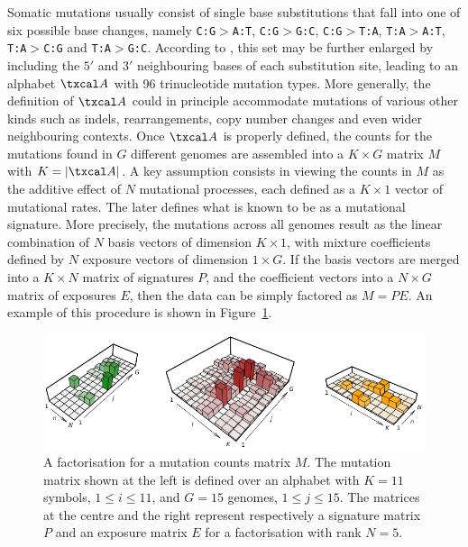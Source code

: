 \documentclass{bioinfo}
\begin{document}
Somatic mutations usually consist of single base substitutions that
fall into one of six possible base changes, namely
\texttt{C:G}$>$\texttt{A:T}, \texttt{C:G}$>$\texttt{G:C},
\texttt{C:G}$>$\texttt{T:A}, \texttt{T:A}$>$\texttt{A:T},
\texttt{T:A}$>$\texttt{C:G} and \texttt{T:A}$>$\texttt{G:C}. According
to \cite{A}, this set may be further enlarged by including the $5'$
and $3'$ neighbouring bases of each substitution site, leading to an 
alphabet $\txcal A$ with 96 trinucleotide mutation types. More
generally, the definition of $\txcal A$ could in principle accommodate
mutations of various other kinds such as indels, rearrangements, copy
number changes and even wider neighbouring contexts. Once $\txcal A$
is properly defined, the counts for the mutations found in $G$
different genomes are assembled into a $K\times G$ matrix $M$ with $K
= |\txcal A|$. A key assumption consists in viewing the counts in $M$
as the additive effect of $N$ mutational processes, each defined as a
$K\times 1$ vector of mutational rates. The later defines what
is known to be as a mutational signature. More precisely, the
mutations across all genomes result as the linear combination of $N$
basis vectors of dimension $K\times 1$, with mixture coefficients
defined by $N$ exposure vectors of dimension $1 \times G$. If the
basis vectors are merged into a $K\times N$ matrix of signatures $P$,
and the coefficient vectors into a $N\times G$ matrix of exposures
$E$, then the data can be simply factored as $M=PE$. An example of
this procedure is shown in Figure~\ref{fig:toyNMF}.

\begin{figure}
 \centering\includegraphics[width=15cm]{figs/f}
 \caption{\textrm{%
  A factorisation for a mutation counts matrix $M$. The
mutation matrix shown at the left is defined over an alphabet with
$K=11$ symbols, $1 \leqslant i \leqslant 11$, and $G=15$ genomes,
$1\leqslant j\leqslant 15$. The matrices at the centre and the right
represent respectively a signature matrix $P$ and an exposure matrix
$E$ for a factorisation with rank $N=5$.
  }
 }
\label{fig:toyNMF}
\end{figure}
\end{document}
